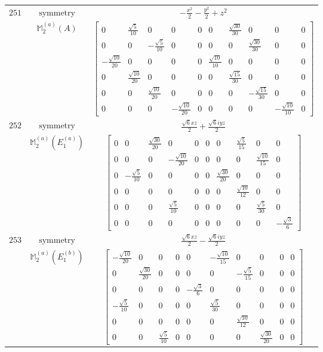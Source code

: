 \documentclass[fleqn,8pt,landscape]{jsarticle}
\begin{document}
\begin{longtable}{ccc}
$ 251 $ & $ \text{symmetry} $ & $ - \frac{x^{2}}{2} - \frac{y^{2}}{2} + z^{2} $ \\
$  $ & $ \mathbb{M}_{2}^{(a)}(A) $ & $ \begin{bmatrix} 0 & \frac{\sqrt{5}}{10} & 0 & 0 & 0 & 0 & \frac{\sqrt{30}}{30} & 0 & 0 & 0 \\ 0 & 0 & - \frac{\sqrt{5}}{10} & 0 & 0 & 0 & 0 & \frac{\sqrt{30}}{30} & 0 & 0 \\ - \frac{\sqrt{10}}{20} & 0 & 0 & 0 & 0 & \frac{\sqrt{10}}{10} & 0 & 0 & 0 & 0 \\ 0 & \frac{\sqrt{10}}{20} & 0 & 0 & 0 & 0 & \frac{\sqrt{15}}{30} & 0 & 0 & 0 \\ 0 & 0 & \frac{\sqrt{10}}{20} & 0 & 0 & 0 & 0 & - \frac{\sqrt{15}}{30} & 0 & 0 \\ 0 & 0 & 0 & - \frac{\sqrt{10}}{20} & 0 & 0 & 0 & 0 & - \frac{\sqrt{10}}{10} & 0 \end{bmatrix} $ \\ \hline
$ 252 $ & $ \text{symmetry} $ & $ \frac{\sqrt{6} x z}{2} + \frac{\sqrt{6} i y z}{2} $ \\
$  $ & $ \mathbb{M}_{2}^{(a)}(E_{1}^{(a)}) $ & $ \begin{bmatrix} 0 & 0 & \frac{\sqrt{30}}{20} & 0 & 0 & 0 & 0 & \frac{\sqrt{5}}{15} & 0 & 0 \\ 0 & 0 & 0 & - \frac{\sqrt{10}}{20} & 0 & 0 & 0 & 0 & \frac{\sqrt{10}}{15} & 0 \\ 0 & - \frac{\sqrt{5}}{10} & 0 & 0 & 0 & 0 & \frac{\sqrt{30}}{20} & 0 & 0 & 0 \\ 0 & 0 & 0 & 0 & 0 & 0 & 0 & \frac{\sqrt{10}}{12} & 0 & 0 \\ 0 & 0 & 0 & \frac{\sqrt{5}}{10} & 0 & 0 & 0 & 0 & \frac{\sqrt{5}}{30} & 0 \\ 0 & 0 & 0 & 0 & 0 & 0 & 0 & 0 & 0 & - \frac{\sqrt{3}}{6} \end{bmatrix} $ \\ \hline
$ 253 $ & $ \text{symmetry} $ & $ \frac{\sqrt{6} x z}{2} - \frac{\sqrt{6} i y z}{2} $ \\
$  $ & $ \mathbb{M}_{2}^{(a)}(E_{1}^{(b)}) $ & $ \begin{bmatrix} - \frac{\sqrt{10}}{20} & 0 & 0 & 0 & 0 & - \frac{\sqrt{10}}{15} & 0 & 0 & 0 & 0 \\ 0 & \frac{\sqrt{30}}{20} & 0 & 0 & 0 & 0 & - \frac{\sqrt{5}}{15} & 0 & 0 & 0 \\ 0 & 0 & 0 & 0 & - \frac{\sqrt{3}}{6} & 0 & 0 & 0 & 0 & 0 \\ - \frac{\sqrt{5}}{10} & 0 & 0 & 0 & 0 & \frac{\sqrt{5}}{30} & 0 & 0 & 0 & 0 \\ 0 & 0 & 0 & 0 & 0 & 0 & \frac{\sqrt{10}}{12} & 0 & 0 & 0 \\ 0 & 0 & \frac{\sqrt{5}}{10} & 0 & 0 & 0 & 0 & \frac{\sqrt{30}}{20} & 0 & 0 \end{bmatrix} $ \\ \hline

\end{longtable}
\end{document}
